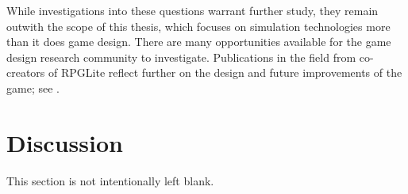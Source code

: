 While investigations into these questions warrant further study, they remain
outwith the scope of this thesis, which focuses on simulation technologies more
than it does game design. There are many opportunities available for the game
design research community to investigate. Publications in the field from
co-creators of RPGLite reflect further on the design and future improvements of
the game; see .


\section{Discussion}\label{sec:future_work_conclusion}

This section is not intentionally left blank.


